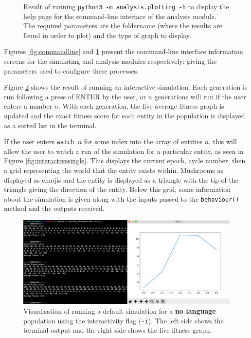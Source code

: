 \documentclass[12pt,a4paper]{report}
\begin{document}
\begin{figure}[t]
\begin{minipage}{0.49\textwidth}
          \caption{Result of running \texttt{python3 -m analysis.plotting -h} to display the help page for the command-line interface of the analysis module. The required parameters are the foldername (where the results are found in order to plot) and the type of graph to display.}
      \label{fig:commandline2}
   \end{minipage}
\end{figure}

Figures \ref{fig:commandline} and \ref{fig:commandline2} present the command-line interface information screens for the simulating and analysis modules respectively; giving the parameters used to configure these processes.

Figure \ref{fig:interactive} shows the result of running an interactive simulation. Each generation is run following a press of ENTER by the user, or $n$ generations will run if the user enters a number $n$. With each generation, the live average fitness graph is updated and the exact fitness score for each entity in the population is displayed as a sorted list in the terminal.

If the user enters \texttt{watch $n$} for some index into the array of entities $n$, this will allow the user to watch a run of the simulation for a particular entity, as seen in Figure \ref{fig:interactivesingle}. This displays the current epoch, cycle number, then a grid representing the world that the entity exists within. Mushrooms as displayed as emojis and the entity is displayed as a triangle with the tip of the triangle giving the direction of the entity. Below this grid, some information about the simulation is given along with the inputs passed to the \texttt{behaviour()} method and the outputs received.

\begin{figure}[ht]
  \centering
  \includegraphics[width=.9\linewidth]{figs/interactive}
  \caption{Visualisation of running a default simulation for a {\bf no language} population using the interactivity flag (\texttt{-i}). The left side shows the terminal output and the right side shows the live fitness graph.}
  \label{fig:interactive}
\end{figure}
\end{document}
